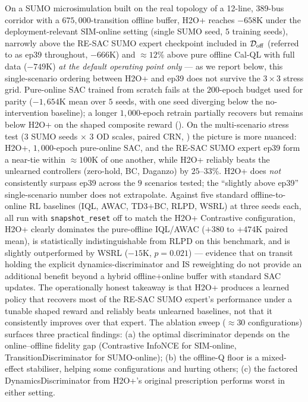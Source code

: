 On a SUMO microsimulation built on the real topology of a 12-line, 389-bus corridor with a $675{,}000$-transition offline buffer, H2O+ reaches $-658$K under the deployment-relevant SIM-online setting (single SUMO seed, $5$ training seeds), narrowly above the RE-SAC SUMO expert checkpoint included in $\mathcal{D}_{\mathrm{off}}$ (referred to as ep39 throughout, $-666$K) and $\approx 12\%$ above pure offline Cal-QL with full data ($-749$K) \emph{at the default operating point only} --- as we report below, this single-scenario ordering between H2O+ and ep39 does not survive the $3 \times 3$ stress grid.
Pure-online SAC trained from scratch fails at the $200$-epoch budget used for parity ($-1{,}654$K mean over $5$ seeds, with one seed diverging below the no-intervention baseline); a longer $1{,}000$-epoch retrain partially recovers but remains below H2O+ on the shaped composite reward ().
On the multi-scenario stress test (3 SUMO seeds $\times$ 3 OD scales, paired CRN, ) the picture is more nuanced: H2O+, $1{,}000$-epoch pure-online SAC, and the RE-SAC SUMO expert ep39 form a near-tie within $\approx 100$K of one another, while H2O+ reliably beats the unlearned controllers (zero-hold, BC, Daganzo) by $25$--$33\%$.
H2O+ does \emph{not} consistently surpass ep39 across the $9$ scenarios tested; the ``slightly above ep39'' single-scenario number does not extrapolate.
Against five standard offline-to-online RL baselines (IQL, AWAC, TD3+BC, RLPD, WSRL) at three seeds each, all run with \texttt{snapshot\_reset} off to match the H2O+ Contrastive configuration, H2O+ clearly dominates the pure-offline IQL/AWAC ($+380$ to $+474$K paired mean), is statistically indistinguishable from RLPD on this benchmark, and is slightly outperformed by WSRL ($-15$K, $p = 0.021$) --- evidence that on transit holding the explicit dynamics-discriminator and IS reweighting do not provide an additional benefit beyond a hybrid offline+online buffer with standard SAC updates.
The operationally honest takeaway is that H2O+ produces a learned policy that recovers most of the RE-SAC SUMO expert's performance under a tunable shaped reward and reliably beats unlearned baselines, not that it consistently improves over that expert.
The ablation sweep ($\approx$30 configurations) surfaces three practical findings: (a) the optimal discriminator depends on the online--offline fidelity gap (Contrastive InfoNCE for SIM-online, TransitionDiscriminator for SUMO-online); (b) the offline-Q floor is a mixed-effect stabiliser, helping some configurations and hurting others; (c) the factored DynamicsDiscriminator from H2O+'s original prescription performs worst in either setting.
